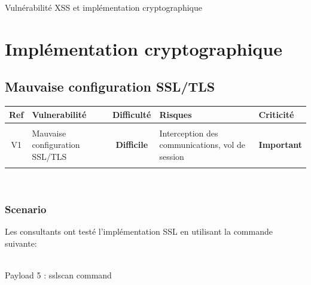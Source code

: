 \documentclass[twoside,a4paper,12pt,titlepage]{book}
\begin{document}
\begin{LongFlagConsole}{Vulnérabilité XSS et implémentation cryptographique}
{{\section*{Implémentation cryptographique}
\subsection*{Mauvaise configuration SSL/TLS}
\begin{tabular}{c | p{3.7cm} c p{4.2cm} p{}}
Ref&Vulnerabilité&Difficulté&Risques&Criticité\\\hline\hline
 & & & & \\
V1&Mauvaise configuration SSL/TLS&\textbf{Difficile}\cellcolor{green}&Interception des communications, vol de session&\textbf{Important}\cellcolor{red}\\
 & & & & \\
\end{tabular}\\
\subsubsection*{Scenario}
Les consultants ont testé l'implémentation SSL en utilisant la commande suivante:
\begin{center}\usebox\SchematicsBox \\
Payload 5 : sslscan command \end{center}
}}
\end{LongFlagConsole}
\end{document}
